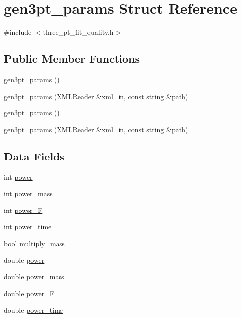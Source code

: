 \hypertarget{structgen3pt__params}{}\section{gen3pt\+\_\+params Struct Reference}
\label{structgen3pt__params}


{\ttfamily \#include $<$three\+\_\+pt\+\_\+fit\+\_\+quality.\+h$>$}

\subsection*{Public Member Functions}
\begin{DoxyCompactItemize}
\item 
\mbox{\hyperlink{structgen3pt__params_abbd834a70ef2f97528dbe72ff6984728}{gen3pt\+\_\+params}} ()
\item 
\mbox{\hyperlink{structgen3pt__params_a0834853ca628d91134726107274bc120}{gen3pt\+\_\+params}} (X\+M\+L\+Reader \&xml\+\_\+in, const string \&path)
\item 
\mbox{\hyperlink{structgen3pt__params_abbd834a70ef2f97528dbe72ff6984728}{gen3pt\+\_\+params}} ()
\item 
\mbox{\hyperlink{structgen3pt__params_a0834853ca628d91134726107274bc120}{gen3pt\+\_\+params}} (X\+M\+L\+Reader \&xml\+\_\+in, const string \&path)
\end{DoxyCompactItemize}
\subsection*{Data Fields}
\begin{DoxyCompactItemize}
\item 
int \mbox{\hyperlink{structgen3pt__params_ac3567c8df4969fa30c9ce9ca8fdcb65b}{power}}
\item 
int \mbox{\hyperlink{structgen3pt__params_ab7335eca59f4c6fcb47868487d202549}{power\+\_\+mass}}
\item 
int \mbox{\hyperlink{structgen3pt__params_a0d5a62e5544d0ec2689973de06cbbdc0}{power\+\_\+F}}
\item 
int \mbox{\hyperlink{structgen3pt__params_af6d428fb1762465fd5fb3b1579f644c3}{power\+\_\+time}}
\item 
bool \mbox{\hyperlink{structgen3pt__params_a9051ec55c5a7a3c9012c7b2018d6e762}{multiply\+\_\+mass}}
\item 
double \mbox{\hyperlink{structgen3pt__params_ac56f4b0ab73f1b2d3909ceec06eca268}{power}}
\item 
double \mbox{\hyperlink{structgen3pt__params_aeaf52e6a42d7afda3c63fe66d371de1c}{power\+\_\+mass}}
\item 
double \mbox{\hyperlink{structgen3pt__params_a21fc9b4bf59cdbaee401a44dd3621281}{power\+\_\+F}}
\item 
double \mbox{\hyperlink{structgen3pt__params_a10354938445a153a8e6505d4b1162ccc}{power\+\_\+time}}
\end{DoxyCompactItemize}


